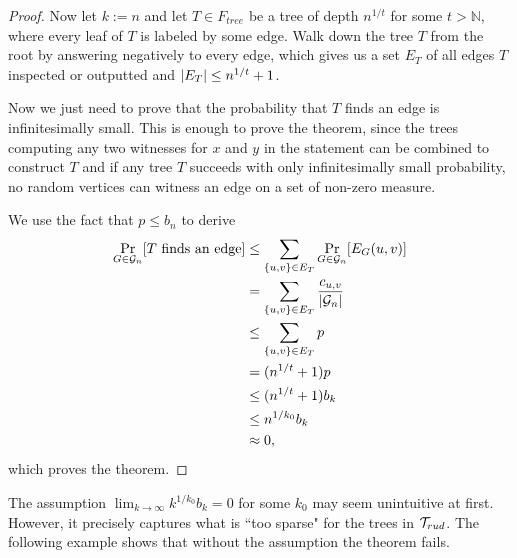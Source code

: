 \begin{proof}
Now let $k:=n$ and let $T\in F_{tree}$ be a tree of depth $n^{1/t}$ for some $t>\mathbb{N}$, where every leaf of $T$ is labeled by some edge. Walk down the tree $T$ from the root by answering negatively to every edge, which gives us a set $E_T$ of all edges $T$ inspected or outputted and $\left|{E_T}\right|\leq n^{1/t}+1$.

Now we just need to prove that the probability that $T$ finds an edge is infinitesimally small. This is enough to prove the theorem, since the trees computing any two witnesses for $x$ and $y$ in the statement can be combined to construct $T$ and if any tree $T$ succeeds with only infinitesimally small probability, no random vertices can witness an edge on a set of non-zero measure.

We use the fact that $p\leq b_n$ to derive 
\begin{align}
\Pr_{G\in\mathcal{G}_n}[T\text{ finds an edge}]&\leq \sum_{\{u,v\}\in E_T} \Pr_{G\in \mathcal{G}_n}[E_G(u,v)]\\
&=\sum_{\{u,v\}\in E_T} \frac{c_{u,v}}{\left|{\mathcal{G}_n}\right|}\\
&\leq\sum_{\{u,v\}\in E_T} p\\
&=(n^{1/t}+1)p\\
&\leq(n^{1/t}+1)b_k\\
&\leq n^{1/k_0}b_k\\
&\approx 0,
\end{align}
which proves the theorem.
\end{proof}

The assumption $\lim_{k\to \infty} k^{1/k_0}b_k=0$ for some $k_0$ may seem unintuitive at first. However, it precisely captures what is ``too sparse" for the trees in $\mathcal{T}_{rud}$. The following example shows that without the assumption the theorem fails.

